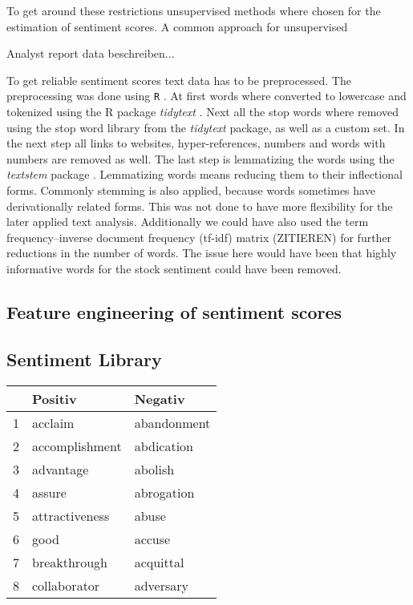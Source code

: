 To get around these restrictions unsupervised methods where chosen for the estimation of sentiment scores. 
A common approach for unsupervised 


Analyst report data beschreiben...

To get reliable sentiment scores text data has to be preprocessed. The preprocessing was done using \texttt{R} \citep{Rproject}. At first words where converted to lowercase and tokenized using the R package \textit{tidytext} \citep{tidytext}. Next all the stop words where removed using the stop word library from the \textit{tidytext} package, as well as a custom set. In the next step all links to websites, hyper-references, numbers and words with numbers are removed as well. 
The last step is lemmatizing the words using the \textit{textstem} package \citep{textstem}. Lemmatizing words means reducing them to their inflectional forms. Commonly stemming is also applied, because words sometimes have derivationally related forms. This was not done to have more flexibility for the later applied text analysis. Additionally we could have also used the term frequency–inverse document frequency (tf-idf) matrix (ZITIEREN) for further reductions in the number of words. The issue here would have been that highly informative words for the stock sentiment could have been removed. 

\subsection{Feature engineering of sentiment scores}

\subsection{Sentiment Library}

\begin{table}[ht]
\centering
\begin{tabular}{rll}
  \hline
 & Positiv & Negativ \\ 
  \hline
1 & acclaim & abandonment \\ 
  2 & accomplishment & abdication \\ 
  3 & advantage & abolish \\ 
  4 & assure & abrogation \\ 
  5 & attractiveness & abuse \\ 
  6 & good & accuse \\ 
  7 & breakthrough & acquittal \\ 
  8 & collaborator & adversary \\ 
   \hline
\end{tabular}
\end{table}


